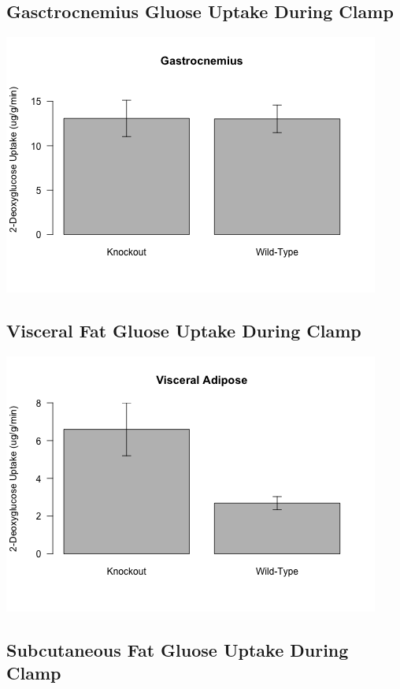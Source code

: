 \documentclass[]{article}
\begin{document}
\subsection{Gasctrocnemius Gluose Uptake During
Clamp}\label{gasctrocnemius-gluose-uptake-during-clamp}

\includegraphics{figures/gastroc-1.png}

\subsection{Visceral Fat Gluose Uptake During
Clamp}\label{visceral-fat-gluose-uptake-during-clamp}

\includegraphics{figures/v-fat-1.png}

\subsection{Subcutaneous Fat Gluose Uptake During
Clamp}\label{subcutaneous-fat-gluose-uptake-during-clamp}
\end{document}
